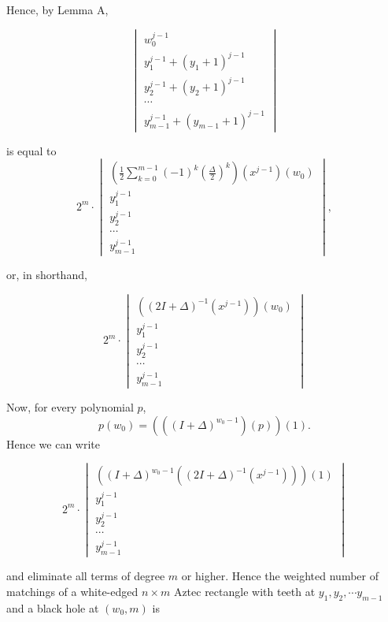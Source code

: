 \documentclass[10pt,reqno]{amsart}
\theoremstyle{plain}
\theoremstyle{definition}
\theoremstyle{remark}
\begin{document}
Hence, by Lemma A,

\begin{equation}
\begin{vmatrix}
w_0^{j-1} \\
y_1^{j-1} + (y_1+1)^{j-1} \\
y_2^{j-1} + (y_2+1)^{j-1} \\
\dotsb \\
y_{m-1}^{j-1} + (y_{m-1} + 1)^{j-1}
\end{vmatrix}
\end{equation}

is equal to
\begin{equation}
2^m\cdot 
\begin{vmatrix}
(\frac{1}{2} \sum_{k=0}^{m-1} (-1)^k (\frac{\Delta }{2})^k)(x^{j-1})(w_0) \\
y_1^{j-1} \\
y_2^{j-1} \\
\dotsb \\
y_{m-1}^{j-1}
\end{vmatrix},
\end{equation}

or, in shorthand,

\begin{equation}
2^m\cdot
\begin{vmatrix}
((2I+\Delta)^{-1} (x^{j-1}))(w_0) \\
y_1^{j-1} \\
y_2^{j-1} \\
\dotsb \\
y_{m-1}^{j-1}
\end{vmatrix}
\end{equation}

Now, for every polynomial $p$, 
\begin{equation}
p(w_0) = (((I+\Delta)^{w_0-1})(p))(1).
\end{equation}
Hence we can write

\begin{equation}
2^m\cdot
\begin{vmatrix}
((I+\Delta)^{w_0-1} ((2I+\Delta)^{-1} (x^{j-1})))(1) \\
y_1^{j-1} \\
y_2^{j-1} \\
\dotsb \\
y_{m-1}^{j-1}
\end{vmatrix}
\end{equation}

and eliminate all terms of degree $m$ or higher. Hence the weighted number
of matchings of a white-edged $n\times m$ Aztec rectangle with teeth at
$y_1,y_2,\dotsb y_{m-1}$ and a black hole at $(w_0,m)$ is
\end{document}
